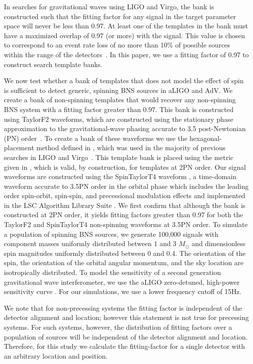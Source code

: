 In searches for gravitational waves using LIGO and Virgo, the bank is constructed
such that the fitting factor for any signal in the target parameter space will
never be less than 0.97. At least one of the templates in the bank must have a
maximized overlap of 0.97 (or more) with the signal. This value is chosen to
correspond to an event rate loss of no more than 10\% of possible sources
within the range of the detectors~\cite{Cutler:1992tc}. In this paper, we use
a fitting factor of 0.97 to construct search template banks.

We now test whether a bank of templates that does not model the effect of spin
is sufficient to detect generic, spinning BNS sources in aLIGO and AdV. We
create a bank of non-spinning templates that would recover any
non-spinning BNS system with a fitting factor greater than 0.97.  This bank is
constructed using TaylorF2 waveforms, which are constructed using the stationary
phase approximation to the gravitational-wave phasing accurate to 3.5
post-Newtonian (PN) order~\cite{DPK99,Blanchet:2006zz}. To create a
bank of these waveforms we use the hexagonal-placement method defined in
\cite{Cokelaer:2007kx}, which was used in the majority of previous searches in
LIGO and Virgo~\cite{Abbott:2009tt,Abbott:2009qj,Abadie:2010yba}. This
template bank is placed using the metric given in \cite{OwenSathyaprakash98},
which is valid, by construction, for templates at 2PN order. 
Our signal waveforms are constructed using the SpinTaylorT4
waveform \cite{BCV03b}, a time-domain waveform accurate to 3.5PN order
in the orbital phase which includes the leading order spin-orbit, spin-spin,
and precessional modulation effects and implemented in the LSC Algorithm Library Suite
\cite{lalsuite}. We first confirm that although the
bank is constructed at 2PN order, it yields fitting factors greater than 0.97
for both the TaylorF2 and SpinTaylorT4 non-spinning waveforms at 3.5PN order.
To simulate a population of spinning BNS sources, we generate 100,000 signals
with component masses uniformly distributed between 1 and 3 $M_{\odot}$ and
dimensionless spin magnitudes uniformly distributed between 0 and 0.4. The orientation
of the spin, the orientation of the orbital angular momentum, and the sky
location are isotropically distributed.  To model the sensitivity of a second
generation gravitational wave interferometer, we use the aLIGO zero-detuned,
high-power sensitivity curve \cite{aLIGOSensCurves}. For our simulations, we
use a lower frequency cutoff of 15Hz.

We note that for non-precessing systems
the fitting factor is independent of the detector alignment and location; however
this statement is not true for precessing systems. For such systems, however,
the distribution of fitting factors over
a population of sources will be independent of the detector alignment
and location. Therefore, for this study we calculate the fitting-factor for a single
detector with an arbitrary location and position.

